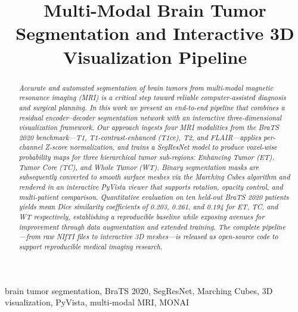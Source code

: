 \documentclass[conference]{IEEEtran}
\begin{document}
\title{Multi-Modal Brain Tumor Segmentation and Interactive 3D Visualization Pipeline}

\author{
}

\maketitle

\begin{abstract}
\textit{Accurate and automated segmentation of brain tumors from multi-modal
magnetic resonance imaging (MRI) is a critical step toward reliable
computer-assisted diagnosis and surgical planning. In this work we present
an end-to-end pipeline that combines a residual encoder--decoder
segmentation network with an interactive three-dimensional visualization
framework. Our approach ingests four MRI modalities from the BraTS 2020
benchmark---T1, T1-contrast-enhanced (T1ce), T2, and FLAIR---applies
per-channel Z-score normalization, and trains a SegResNet model to produce
voxel-wise probability maps for three hierarchical tumor sub-regions:
Enhancing Tumor (ET), Tumor Core (TC), and Whole Tumor (WT). Binary
segmentation masks are subsequently converted to smooth surface meshes via
the Marching Cubes algorithm and rendered in an interactive PyVista viewer
that supports rotation, opacity control, and multi-patient comparison.
Quantitative evaluation on ten held-out BraTS 2020 patients yields mean
Dice similarity coefficients of 0.203, 0.261, and 0.194 for ET, TC, and
WT respectively, establishing a reproducible baseline while exposing
avenues for improvement through data augmentation and extended training.
The complete pipeline---from raw NIfTI files to interactive 3D meshes---is
released as open-source code to support reproducible medical imaging
research.}
\end{abstract}

\begin{IEEEkeywords}
brain tumor segmentation, BraTS 2020, SegResNet, Marching Cubes,
3D visualization, PyVista, multi-modal MRI, MONAI
\end{IEEEkeywords}
\end{document}
